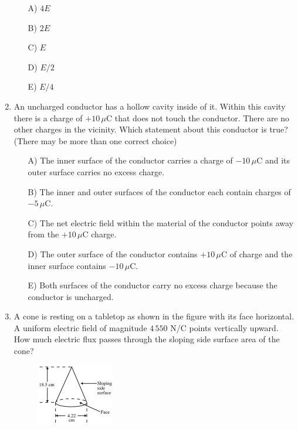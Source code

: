 \begin{enumerate}
    \begin{multicols}{5}
    \begin{itemize}
        \item[A)] $4E$
        \item[B)] $2E$
        \item[C)] $E$
        \item[D)] $E/2$
        \item[E)] $E/4$
    \end{itemize}
    \end{multicols}


    \item An uncharged conductor has a hollow cavity inside of it. Within this cavity there is a charge of $+10\,\mu$C that does not touch the conductor. There are no other charges in the vicinity. Which statement about this conductor is true? (There may be more than one correct choice)
    
    \begin{itemize}
        \item[A)] The inner surface of the conductor carries a charge of $-10\,\mu$C and its outer surface carries no excess charge.
        \item[B)] The inner and outer surfaces of the conductor each contain charges of $-5\,\mu$C.
        \item[C)] The net electric field within the material of the conductor points away from the $+10\,\mu$C charge.
        \item[D)] The outer surface of the conductor contains $+10\,\mu$C of charge and the inner surface contains $-10\,\mu$C.
        \item[E)] Both surfaces of the conductor carry no excess charge because the conductor is uncharged.
    \end{itemize}


    \item A cone is resting on a tabletop as shown in the figure with its face horizontal. A uniform electric field of magnitude $4\,550$ N/C points vertically upward. How much electric flux passes through the sloping side surface area of the cone?

    \begin{figure}[H]
        \centering
        \includegraphics[width=0.32\textwidth]{figures-workshop01/problem-23.png}
    \end{figure}


\end{enumerate}
